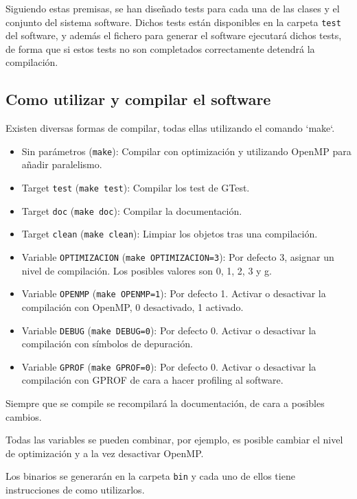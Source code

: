 Siguiendo estas premisas, se han diseñado tests para cada una de las clases y el conjunto del sistema software. Dichos tests están disponibles en la carpeta \texttt{test} del software, y además el fichero para generar el software ejecutará dichos tests, de forma que si estos tests no son completados correctamente detendrá la compilación.

\newpage

\subsection{Como utilizar y compilar el software}

Existen diversas formas de compilar, todas ellas utilizando el comando `make`.

\begin{itemize}
	\item Sin parámetros (\texttt{make}): Compilar con optimización y utilizando OpenMP para añadir paralelismo.
	\item Target \texttt{test} (\texttt{make test}): Compilar los test de GTest.
	\item Target \texttt{doc} (\texttt{make doc}): Compilar la documentación.
	\item Target \texttt{clean} (\texttt{make clean}): Limpiar los objetos tras una compilación.
	\item Variable \texttt{OPTIMIZACION} (\texttt{make OPTIMIZACION=3}): Por defecto 3, asignar un nivel de compilación. Los posibles valores son 0, 1, 2, 3 y g.
	\item Variable \texttt{OPENMP} (\texttt{make OPENMP=1}): Por defecto 1. Activar o desactivar la compilación con OpenMP, 0 desactivado, 1 activado.
	\item Variable \texttt{DEBUG} (\texttt{make DEBUG=0}): Por defecto 0. Activar o desactivar la compilación con símbolos de depuración.
	\item Variable \texttt{GPROF} (\texttt{make GPROF=0}): Por defecto 0. Activar o desactivar la compilación con GPROF de cara a hacer profiling al software.

\end{itemize}

Siempre que se compile se recompilará la documentación, de cara a posibles cambios.

Todas las variables se pueden combinar, por ejemplo, es posible cambiar el nivel de optimización y a la vez desactivar OpenMP.

Los binarios se generarán en la carpeta \texttt{bin} y cada uno de ellos tiene instrucciones de como utilizarlos.

